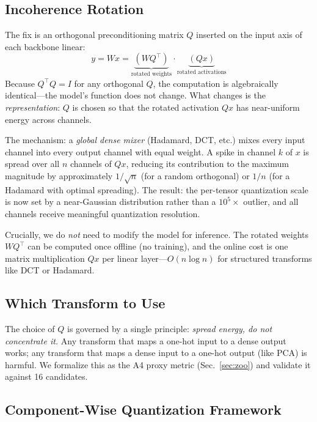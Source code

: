 \documentclass[conference]{IEEEtran}
\begin{document}
\subsection{Incoherence Rotation}
\label{sec:rotation_method}

The fix is an orthogonal preconditioning matrix $Q$ inserted on the input axis of each
backbone linear:
\begin{equation}
  y = Wx = \underbrace{(WQ^\top)}_{\text{rotated weights}} \cdot \underbrace{(Qx)}_{\text{rotated activations}}
\end{equation}
Because $Q^\top Q = I$ for any orthogonal $Q$, the computation is algebraically identical---the
model's function does not change. What changes is the \emph{representation}: $Q$ is chosen so
that the rotated activation $Qx$ has near-uniform energy across channels.

The mechanism: a \emph{global dense mixer} (Hadamard, DCT, etc.) mixes every input channel
into every output channel with equal weight. A spike in channel $k$ of $x$ is spread over all
$n$ channels of $Qx$, reducing its contribution to the maximum magnitude by approximately
$1/\sqrt{n}$ (for a random orthogonal) or $1/n$ (for a Hadamard with optimal spreading).
The result: the per-tensor quantization scale is now set by a near-Gaussian distribution
rather than a $10^5\times$ outlier, and all channels receive meaningful quantization resolution.

Crucially, we do \emph{not} need to modify the model for inference. The rotated weights
$WQ^\top$ can be computed once offline (no training), and the online cost is one matrix
multiplication $Qx$ per linear layer---$O(n\log n)$ for structured transforms like DCT or
Hadamard.

\subsection{Which Transform to Use}
\label{sec:which}

The choice of $Q$ is governed by a single principle: \emph{spread energy, do not concentrate
it.} Any transform that maps a one-hot input to a dense output works; any transform that
maps a dense input to a one-hot output (like PCA) is harmful. We formalize this as the
A4 proxy metric (Sec.~\ref{sec:zoo}) and validate it against 16 candidates.

\subsection{Component-Wise Quantization Framework}
\label{sec:comp_framework}
\end{document}
